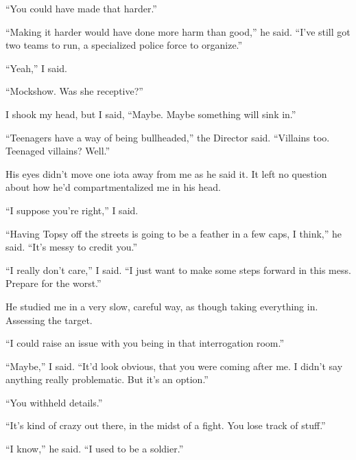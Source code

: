 ``You could have made that harder.''



``Making it harder would have done more harm than good,'' he said.  ``I've still got two teams to run, a specialized police force to organize.''



``Yeah,'' I said.



``Mockshow.  Was she receptive?''



I shook my head, but I said, ``Maybe.  Maybe something will sink in.''



``Teenagers have a way of being bullheaded,'' the Director said.  ``Villains too.  Teenaged villains?  Well.''



His eyes didn't move one iota away from me as he said it.  It left no question about how he'd compartmentalized me in his head.



``I suppose you're right,'' I said.



``Having Topsy off the streets is going to be a feather in a few caps, I think,'' he said.  ``It's messy to credit you.''



``I really don't care,'' I said.  ``I just want to make some steps forward in this mess.  Prepare for the worst.''



He studied me in a very slow, careful way, as though taking everything in.  Assessing the target.



``I could raise an issue with you being in that interrogation room.''



``Maybe,'' I said.  ``It'd look obvious, that you were coming after me.  I didn't say anything really problematic.  But it's an option.''



``You withheld details.''



``It's kind of crazy out there, in the midst of a fight.  You lose track of stuff.''



``I know,'' he said.  ``I used to be a soldier.''



